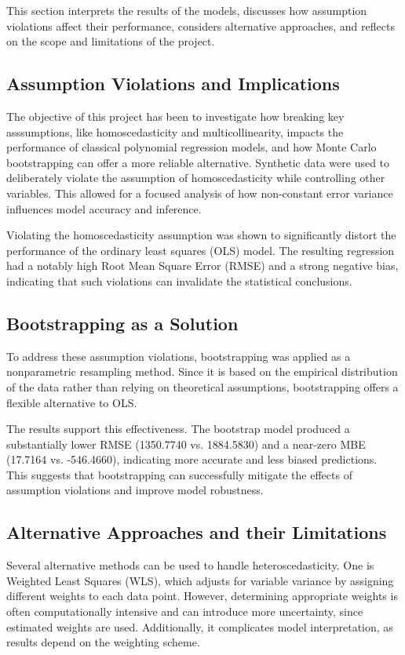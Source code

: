 This section interprets the results of the models, discusses how assumption violations affect their performance, considers alternative approaches, and reflects on the scope and limitations of the project.

\subsection{Assumption Violations and Implications}
The objective of this project has been to investigate how breaking key asssumptions, like homoscedasticity and multicollinearity, impacts the performance of classical polynomial regression models, and how Monte Carlo bootstrapping can offer a more reliable alternative. Synthetic data were used to deliberately violate the assumption of homoscedasticity while controlling other variables. This allowed for a focused analysis of how non-constant error variance influences model accuracy and inference.

\noindent Violating the homoscedasticity assumption was shown to significantly distort the performance of the ordinary least squares (OLS) model. The resulting regression had a notably high Root Mean Square Error (RMSE) and a strong negative bias, indicating that such violations can invalidate the statistical conclusions. 

\subsection{Bootstrapping as a Solution}
To address these assumption violations, bootstrapping was applied as a nonparametric resampling method. Since it is based on the empirical distribution of the data rather than relying on theoretical assumptions, bootstrapping offers a flexible alternative to OLS.

\noindent The results support this effectiveness. The bootstrap model produced a substantially lower RMSE (1350.7740 vs. 1884.5830) and a near-zero MBE (17.7164 vs. -546.4660), indicating more accurate and less biased predictions. This suggests that bootstrapping can successfully mitigate the effects of assumption violations and improve model robustness.

\subsection{Alternative Approaches and their Limitations}
Several alternative methods can be used to handle heteroscedasticity. One is Weighted Least Squares (WLS), which adjusts for variable variance by assigning different weights to each data point. However, determining appropriate weights is often computationally intensive and can introduce more uncertainty, since estimated weights are used. Additionally, it complicates model interpretation, as results depend on the weighting scheme.

